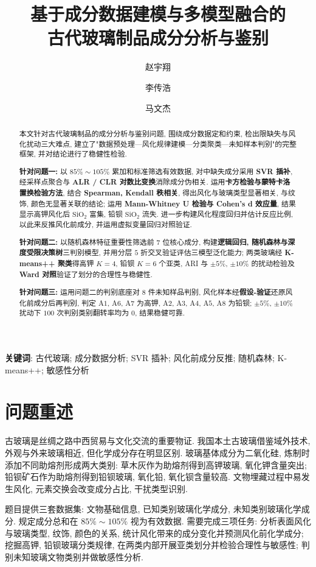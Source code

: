 \documentclass{ctexart}
\title{基于成分数据建模与多模型融合的 \\ 古代玻璃制品成分分析与鉴别}
\author{赵宇翔 \and 李传浩 \and 马文杰}
\begin{document}
\maketitle

\begin{abstract}
本文针对古代玻璃制品的成分分析与鉴别问题, 围绕成分数据定和约束, 检出限缺失与风化扰动三大难点, 建立了"数据预处理—风化规律建模—分类聚类—未知样本判别"的完整框架, 并对结论进行了稳健性检验.

\textbf{针对问题一:} 以 $85\%\sim105\%$ 累加和标准筛选有效数据, 对中缺失成分采用 \textbf{SVR 插补}, 经采样点聚合与 \textbf{ALR / CLR 对数比变换}消除成分伪相关. 运用\textbf{卡方检验与蒙特卡洛置换检验方法}, 结合 \textbf{Spearman, Kendall 秩相关}, 得出风化与玻璃类型显著相关, 与纹饰, 颜色无显著关联的结论; 运用 \textbf{Mann-Whitney U 检验与 Cohen's d 效应量}, 结果显示高钾风化后 $\mathrm{SiO_2}$ 富集, 铅钡 $\mathrm{SiO_2}$ 流失. 进一步构建风化程度回归并估计反应比例, 以此来反推风化前成分, 并运用虚拟变量回归对照验证.

\textbf{针对问题二:} 以随机森林特征重要性筛选前 $7$ 位核心成分, 构建\textbf{逻辑回归, 随机森林与深度受限决策树}三判别模型, 并用分层 $5$ 折交叉验证评估三模型泛化能力; 两类玻璃经 \textbf{K-means++ 聚类}得高钾 $K=4$, 铅钡 $K=6$ 个亚类, ARI 与 $\pm5\%$, $\pm10\%$ 的扰动检验及 \textbf{Ward 对照}验证了划分的合理性与稳健性.

\textbf{针对问题三:} 运用问题二的判别底座对 $8$ 件未知样品判别, 风化样本经\textbf{假设-验证}还原风化前成分后再判别, 判定 $\mathrm{A}1$, $\mathrm{A}6$, $\mathrm{A}7$ 为高钾, $\mathrm{A}2$, $\mathrm{A}3$, $\mathrm{A}4$, $\mathrm{A}5$, $\mathrm{A}8$ 为铅钡; $\pm5\%$, $\pm10\%$ 扰动下 $100$ 次判别类别翻转率均为 $0$, 结果稳健可靠.
\end{abstract}

\textbf{关键词}: 古代玻璃; 成分数据分析; SVR 插补; 风化前成分反推; 随机森林; K-means++; 敏感性分析

\section{问题重述}

古玻璃是丝绸之路中西贸易与文化交流的重要物证. 我国本土古玻璃借鉴域外技术, 外观与外来玻璃相近, 但化学成分存在明显区别. 玻璃基体成分为二氧化硅, 炼制时添加不同助熔剂形成两大类别: 草木灰作为助熔剂得到高钾玻璃, 氧化钾含量突出; 铅钡矿石作为助熔剂得到铅钡玻璃, 氧化铅, 氧化钡含量较高. 文物埋藏过程中易发生风化, 元素交换会改变成分占比, 干扰类型识别.

题目提供三套数据集: 文物基础信息, 已知类别玻璃化学成分, 未知类别玻璃化学成分. 规定成分总和在 $85\%\sim105\%$ 视为有效数据. 需要完成三项任务: 分析表面风化与玻璃类型, 纹饰, 颜色的关系, 统计风化带来的成分变化并预测风化前化学成分; 挖掘高钾, 铅钡玻璃分类规律, 在两类内部开展亚类划分并检验合理性与敏感性; 判别未知玻璃文物类别并做敏感性分析.
\end{document}

